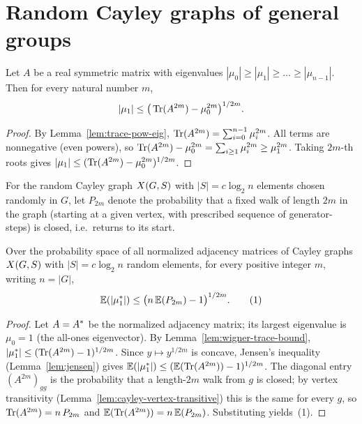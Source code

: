 \chapter{Random Cayley graphs of general groups}


\begin{lemma}
  \label{lem:wigner-trace-bound}
  Let $A$ be a real symmetric matrix with eigenvalues
  $|\mu_0| \ge |\mu_1| \ge \dots \ge |\mu_{n-1}|$. Then for every natural number
  $m$,
  \[
    |\mu_1| \le \big(\operatorname{Tr}(A^{2m}) - \mu_0^{2m}\big)^{1/2m}.
  \]
\end{lemma}
\begin{proof}
  By Lemma~\ref{lem:trace-pow-eig}, $\operatorname{Tr}(A^{2m}) = \sum_{i=0}^{n-1}\mu_i^{2m}$.
  All terms are nonnegative (even powers), so
  $\operatorname{Tr}(A^{2m}) - \mu_0^{2m} = \sum_{i \ge 1}\mu_i^{2m} \ge \mu_1^{2m}$. Taking
  $2m$-th roots gives $|\mu_1| \le (\operatorname{Tr}(A^{2m}) - \mu_0^{2m})^{1/2m}$.
\end{proof}

\begin{definition}
  \label{def:closed-walk-prob}
  For the random Cayley graph $X(G,S)$ with $|S| = c\log_2 n$ elements chosen
  randomly in $G$, let $P_{2m}$ denote the probability that a fixed walk of
  length $2m$ in the graph (starting at a given vertex, with prescribed sequence
  of generator-steps) is closed, i.e.\ returns to its start.
\end{definition}

\begin{lemma}
  \label{lem:expected-mu-bound}
  Over the probability space of all normalized adjacency matrices of Cayley
  graphs $X(G,S)$ with $|S| = c\log_2 n$ random elements, for every positive
  integer $m$, writing $n = |G|$,
  \[
    \mathbb{E}(|\mu_{1}^{*}|) \le \big(n\,\mathbb{E}(P_{2m}) - 1\big)^{1/2m}. \tag{1}
  \]
\end{lemma}
\begin{proof}
  Let $A = A^{*}$ be the normalized adjacency matrix; its largest eigenvalue is
  $\mu_0 = 1$ (the all-ones eigenvector). By Lemma~\ref{lem:wigner-trace-bound},
  $|\mu_{1}^{*}| \le (\operatorname{Tr}(A^{2m}) - 1)^{1/2m}$. Since $y \mapsto y^{1/2m}$ is
  concave, Jensen's inequality (Lemma~\ref{lem:jensen}) gives
  $\mathbb{E}(|\mu_{1}^{*}|) \le (\mathbb{E}(\operatorname{Tr}(A^{2m})) - 1)^{1/2m}$. The diagonal entry
  $(A^{2m})_{gg}$ is the probability that a length-$2m$ walk from $g$ is closed;
  by vertex transitivity (Lemma~\ref{lem:cayley-vertex-transitive}) this is the
  same for every $g$, so $\operatorname{Tr}(A^{2m}) = n\,P_{2m}$ and
  $\mathbb{E}(\operatorname{Tr}(A^{2m})) = n\,\mathbb{E}(P_{2m})$. Substituting yields~(1).
\end{proof}

